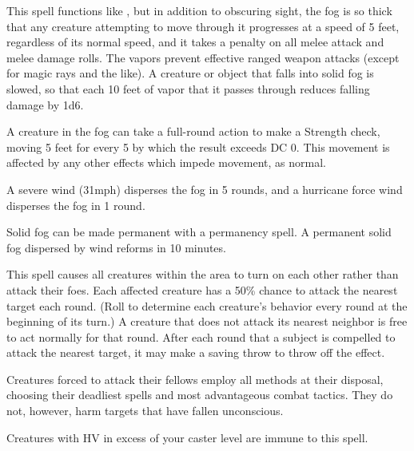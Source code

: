 \spelldur{\durmed}
\begin{spelleffect}
  This spell functions like , but in addition to obscuring sight, the fog is so thick that any creature attempting to move through it progresses at a speed of 5 feet, regardless of its normal speed, and it takes a  penalty on all melee attack and melee damage rolls. The vapors prevent effective ranged weapon attacks (except for magic rays and the like). A creature or object that falls into solid fog is slowed, so that each 10 feet of vapor that it passes through reduces falling damage by 1d6.
  \par A creature in the fog can take a full-round action to make a Strength check, moving 5 feet for every 5 by which the result exceeds DC 0. This movement is affected by any other effects which impede movement, as normal.
\end{spelleffect}
\begin{spellnotes}
  A severe wind (31\add mph) disperses the fog in 5 rounds, and a hurricane force wind disperses the fog in 1 round.
  \par Solid fog can be made permanent with a permanency spell. A permanent solid fog dispersed by wind reforms in 10 minutes.
\end{spellnotes}

\spelldur{\durshort}
\begin{spelleffect}
  This spell causes all creatures within the area to turn on each other rather than attack their foes. Each affected creature has a 50\% chance to attack the nearest target each round. (Roll to determine each creature's behavior every round at the beginning of its turn.) A creature that does not attack its nearest neighbor is free to act normally for that round. After each round that a subject is compelled to attack the nearest target, it may make a saving throw to throw off the effect.
  \par Creatures forced to attack their fellows employ all methods at their disposal, choosing their deadliest spells and most advantageous combat tactics. They do not, however, harm targets that have fallen unconscious.
\end{spelleffect}
\begin{spellnotes}
  Creatures with HV in excess of your caster level are immune to this spell.
\end{spellnotes}

